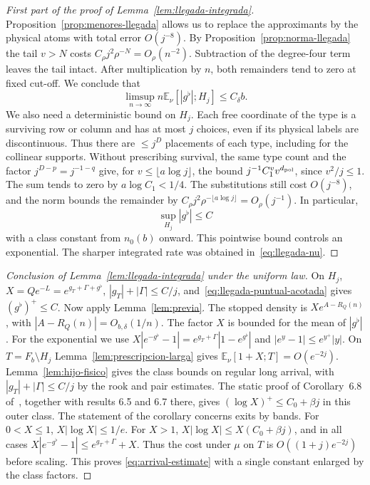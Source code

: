 \begin{proof}[First part of the proof of Lemma~\ref{lem:llegada-integrada}]
Proposition~\ref{prop:menores-llegada} allows us to replace the approximants by the physical atoms with
total error \(O(j^{-8})\). By Proposition~\ref{prop:norma-llegada} the tail \(v>N\) costs \(C_\rho
j^2\rho^{-N}=O_\rho(n^{-2})\). Subtraction of the degree-four term leaves the tail intact. After
multiplication by \(n\), both remainders tend to zero at fixed cut-off. We conclude that
\begin{equation}\label{eq:llegada-nu}
 \limsup_{n\to\infty} n\mathbb E_\nu[|g^\flat|;H_j]\le C_\delta b .
\end{equation}
We also need a deterministic bound on \(H_j\). Each free coordinate of the type is a surviving row or
column and has at most \(j\) choices, even if its physical labels are discontinuous. Thus there are \(\le
j^D\) placements of each type, including for the collinear supports. Without prescribing survival, the same
type count and the factor \(j^{D-p}=j^{-1-q}\) give, for \(v\le\lfloor a\log j\rfloor\), the bound
\(j^{-1}C_1^v v^{d_{\rm pol}}\), since \(v^2/j\le1\). The sum tends to zero by \(a\log C_1<1/4\). The
substitutions still cost \(O(j^{-8})\), and the norm bounds the remainder by \(C_\rho j^2\rho^{-\lfloor
a\log j\rfloor}=O_\rho(j^{-1})\). In particular,
\begin{equation}\label{eq:llegada-puntual-acotada}
 \sup_{H_j}|g^\flat|\le C
\end{equation}
with a class constant from \(n_0(b)\) onward. This pointwise bound controls an exponential. The sharper
integrated rate was obtained in~\eqref{eq:llegada-nu}.
\end{proof}

\begin{proof}[Conclusion of Lemma~\ref{lem:llegada-integrada} under the uniform law]
On \(H_j\), \(X=Qe^{-L}=e^{g_T+\Gamma+g^\flat}\), \(|g_T|+|\Gamma|\le C/j\),
and~\eqref{eq:llegada-puntual-acotada} gives \((g^\flat)^+\le C\). Now apply Lemma~\ref{lem:previa}. The
stopped density is \(Xe^{A-R_Q(n)}\), with \(|A-R_Q(n)|=O_{b,\delta}(1/n)\). The factor \(X\) is bounded
for the mean of \(|g^\flat|\). For the exponential we use
\(X|e^{-g^\flat}-1|=e^{g_T+\Gamma}|1-e^{g^\flat}|\) and \(|e^y-1|\le e^{y^+}|y|\). On \(T=F_b\setminus
H_j\) Lemma~\ref{lem:prescripcion-larga} gives \(\mathbb E_\nu[1+X;T]=O(e^{-2j})\).
Lemma~\ref{lem:hijo-fisico} gives the class bounds on regular long arrival, with \(|g_T|+|\Gamma|\le
C/j\) by the rook and pair estimates. The static proof of Corollary~6.8 of~\cite{tc}, together with
results 6.5 and 6.7 there, gives \((\log X)^+\le C_0+\beta j\) in this outer class. The statement of the
corollary concerns exits by bands. For \(0<X\le1\), \(X|\log X|\le1/e\). For \(X>1\), \(X|\log X|\le
X(C_0+\beta j)\), and in all cases \(X|e^{-g^\flat}-1|\le e^{g_T+\Gamma}+X\). Thus the cost under \(\mu\)
on \(T\) is \(O((1+j)e^{-2j})\) before scaling. This proves \eqref{eq:arrival-estimate} with a single
constant enlarged by the class factors.
\end{proof}

